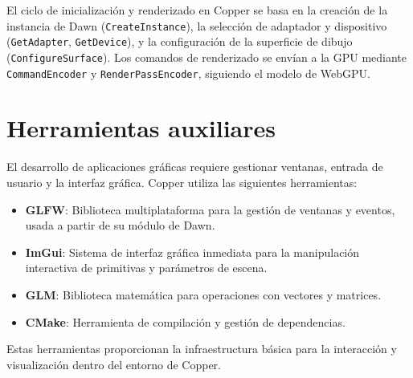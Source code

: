 El ciclo de inicialización y renderizado en Copper se basa en la creación de la
instancia de Dawn (\texttt{CreateInstance}), la selección de adaptador y
dispositivo (\texttt{GetAdapter}, \texttt{GetDevice}), y la configuración de la
superficie de dibujo (\texttt{ConfigureSurface}). Los comandos de renderizado
se envían a la GPU mediante \texttt{CommandEncoder} y
\texttt{RenderPassEncoder}, siguiendo el modelo de WebGPU.

\section{Herramientas auxiliares}

El desarrollo de aplicaciones gráficas requiere gestionar ventanas, entrada de
usuario y la interfaz gráfica. Copper utiliza las siguientes herramientas:

\begin{itemize}
    \item \textbf{GLFW}: Biblioteca multiplataforma para la gestión de ventanas y eventos, usada a partir de su módulo de Dawn\cite{glfw-docs}.
    \item \textbf{ImGui}: Sistema de interfaz gráfica inmediata para la manipulación interactiva de primitivas y parámetros de escena\cite{imgui}.
    \item \textbf{GLM}: Biblioteca matemática para operaciones con vectores y matrices\cite{glm}.
    \item \textbf{CMake}: Herramienta de compilación y gestión de dependencias\cite{cmake-docs}.
\end{itemize}

Estas herramientas proporcionan la infraestructura básica para la interacción y
visualización dentro del entorno de Copper.